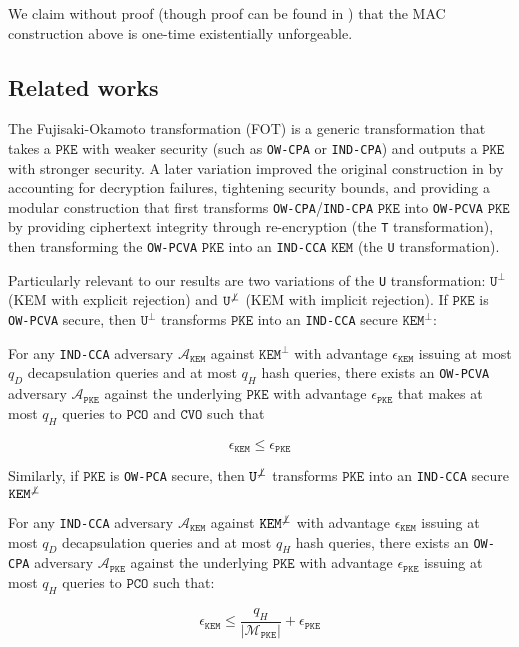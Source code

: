 \documentclass[floatrow,journal=tches,submission]{iacrtrans}
\newcommand{\pke}{\texttt{PKE}}
\newcommand{\kem}{\texttt{KEM}}
\newcommand{\pco}{\texttt{PCO}}
\newcommand{\cvo}{\texttt{CVO}}
\newcommand{\norm}[1]{\left\lvert #1 \right\rvert}
\begin{document}
We claim without proof (though proof can be found in \cite{boneh2020graduate}) that the MAC construction above is one-time existentially unforgeable.

\subsection{Related works}
The Fujisaki-Okamoto transformation (FOT) \cite{fujisaki1999secure} is a generic transformation that takes a $\pke$ with weaker security (such as \texttt{OW-CPA} or \texttt{IND-CPA}) and outputs a $\pke$ with stronger security. A later variation \cite{hofheinz2017modular} improved the original construction in \cite{fujisaki1999secure} by accounting for decryption failures, tightening security bounds, and providing a modular construction that first transforms \texttt{OW-CPA}/\texttt{IND-CPA} $\pke$ into \texttt{OW-PCVA} $\pke$ by providing ciphertext integrity through re-encryption (the \texttt{T} transformation), then transforming the \texttt{OW-PCVA} $\pke$ into an \texttt{IND-CCA} $\kem$ (the \texttt{U} transformation).


Particularly relevant to our results are two variations of the \texttt{U} transformation: $\texttt{U}^\bot$ (KEM with explicit rejection) and $\texttt{U}^{\not\bot}$ (KEM with implicit rejection). If $\pke$ is \texttt{OW-PCVA} secure, then $\texttt{U}^\bot$ transforms $\pke$ into an \texttt{IND-CCA} secure $\kem^\bot$:

\begin{theorem}\label{thm:u-bot}
    For any \texttt{IND-CCA} adversary $\mathcal{A}_\kem$ against $\kem^\bot$ with advantage $\epsilon_\kem$ issuing at most $q_D$ decapsulation queries and at most $q_H$ hash queries, there exists an \texttt{OW-PCVA} adversary $\mathcal{A}_\pke$ against the underlying $\pke$ with advantage $\epsilon_\pke$ that makes at most $q_H$ queries to $\pco$ and $\cvo$ such that

    \begin{equation*}
        \epsilon_\kem \leq \epsilon_\pke
    \end{equation*}
\end{theorem}

Similarly, if $\pke$ is \texttt{OW-PCA} secure, then $\texttt{U}^{\not\bot}$ transforms $\pke$ into an \texttt{IND-CCA} secure $\kem^{\not\bot}$

\begin{theorem}\label{thm:u-notbot}
    For any \texttt{IND-CCA} adversary $\mathcal{A}_\kem$ against $\kem^{\not\bot}$ with advantage $\epsilon_\kem$ issuing at most $q_D$ decapsulation queries and at most $q_H$ hash queries, there exists an \texttt{OW-CPA} adversary $\mathcal{A}_\pke$ against the underlying $\pke$ with advantage $\epsilon_\pke$ issuing at most $q_H$ queries to $\pco$ such that:

    \begin{equation*}
        \epsilon_\kem \leq \frac{q_H}{\norm{\mathcal{M}_\pke}} + \epsilon_\pke
    \end{equation*}
\end{theorem}
\end{document}
